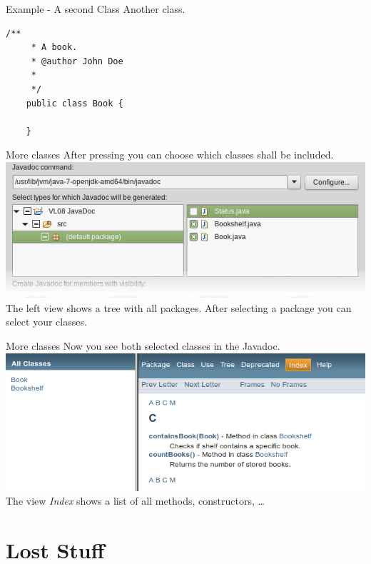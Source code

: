 \begin{frame}[fragile]{Example - A second Class}
	Another class.
	\begin{lstlisting}[basicstyle=\ttfamily\scriptsize, escapechar=!,
	commentstyle=\color{lightblue}]
	/**
	 * A book.
	 * @author John Doe
	 *
	 */
	public class Book {

	}
	\end{lstlisting}
\end{frame}

\begin{frame}[fragile]{More classes}
	After pressing 
	you can choose which classes shall be included.
	\vfill
	\includegraphics[scale=0.35]{res/javadoc_selection.png}
	\vfill
	The left view shows a tree with all packages. 
	After selecting a package you can select your classes.
\end{frame}

\begin{frame}[fragile]{More classes}
	Now you see both selected classes in the Javadoc.
	\vfill
	\includegraphics[scale=0.35]{res/javadoc_multiple_classes.png}
	\vfill
	The view \emph{Index} shows a list of all methods, constructors, \dots
\end{frame}

\section{Lost Stuff}
